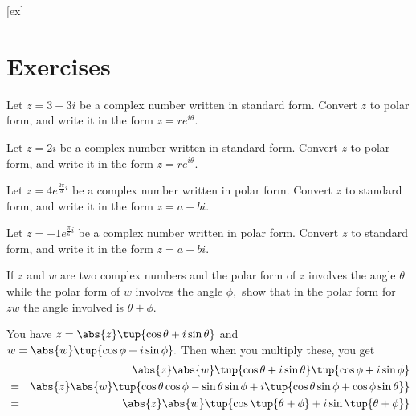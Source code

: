 [ex]
\section*{Exercises}

\begin{enumialphparenastyle}

\begin{ex} Let $z = 3 + 3i$ be a complex number written in standard form. Convert $z$ to polar form, and write it in the form $z = re^{i\theta}$.
\end{ex}

\begin{ex} Let $z = 2i$ be a complex number written in standard form. Convert $z$ to polar form, and write it in the form $z = re^{i\theta}$.
\end{ex}

\begin{ex} Let $z = 4e^{\frac{2\pi}{3}i}$ be a complex number written in polar form. Convert $z$ to standard form, and write it in the form $z = a+bi$.
\end{ex}

\begin{ex} Let $z = -1e^{\frac{\pi}{6}i}$ be a complex number written in polar form. Convert $z$ to standard form, and write it in the form $z = a+bi$.
\end{ex}

\begin{ex} If $z$ and $w$ are two complex numbers and the polar form of $z$
involves the angle $\theta $ while the polar form of $w$ involves the angle 
$\phi ,$ show that in the polar form for $zw$ the angle involved is $\theta
+\phi .$ 
\begin{sol}
 You have $z=\abs{z}\tup{\cos
\theta +i\sin \theta } $ and $w=\abs{w}\tup{\cos
\phi +i\sin \phi } .$ Then when you multiply these, you get
\begin{eqnarray*}
&&\abs{z}\abs{w}\tup{\cos \theta +i\sin
\theta } \tup{\cos \phi +i\sin \phi } \\
&=&\abs{z}\abs{w}\tup{\cos \theta \cos
\phi -\sin \theta \sin \phi +i\tup{\cos \theta \sin \phi +\cos \phi \sin
\theta } } \\
&=&\abs{z}\abs{w}\tup{\cos \tup{\theta
+\phi } +i\sin \tup{\theta +\phi } }
\end{eqnarray*}
\end{sol}
\end{ex}

\end{enumialphparenastyle}